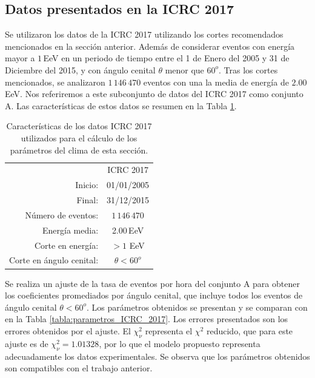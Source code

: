 
\subsection{Datos presentados en la ICRC 2017}\label{icrc2015}

Se utilizaron los datos de la ICRC 2017 utilizando los cortes recomendados mencionados en la sección anterior. Además de considerar eventos con energía mayor a $1\,$EeV en un periodo de tiempo entre el 1 de Enero del 2005 y 31 de Diciembre del 2015, y con ángulo cenital $\theta$ menor que $60^o$.  Tras los cortes mencionados, se analizaron $1\,146\,470$ eventos con una la media de energía de $2.00\,$EeV. Nos referiremos a este subconjunto de datos del ICRC 2017  como conjunto A. Las características de estos datos se resumen en la Tabla \ref{tabla:caracteristicas_ICRC_2017}.
        \begin{table}[H]
            \centering
            \begin{tabular}{r|c|} \cline{2-2}
                & ICRC 2017 \\ \cline{2-2}
            Inicio:              & 01/01/2005 \\ 
            Final:               & 31/12/2015  \\ 
            Número de eventos:   & $1\,146\,470$ \\ 
            Energía media:       & 2.00\,EeV    				\\ 
            Corte en energía:    & $> 1$ EeV        				\\ 
            Corte en ángulo cenital:		& $\theta < 60^o$ 				\\ \cline{2-2}
            \end{tabular}
        \caption{Características de los datos ICRC 2017 utilizados para el cálculo de los parámetros del clima de esta sección. } \label{tabla:caracteristicas_ICRC_2017}
        \end{table}

        Se realiza un ajuste de la tasa de eventos por hora del conjunto A para obtener los coeficientes promediados por ángulo cenital, que incluye todos los eventos de ángulo cenital $\theta< 60^o$. Los parámetros obtenidos se presentan y se comparan con \cite{aab2017impact} en la Tabla \ref{tabla:parametros_ICRC_2017}. Los errores presentados son los errores obtenidos por el ajuste. El $\chi^2_\nu$ representa el $\chi^2$ reducido, que para este ajuste es de $\chi^2_\nu=1.01328$, por lo que el modelo propuesto representa adecuadamente los datos experimentales. Se observa que los parámetros obtenidos son compatibles con el trabajo anterior.

